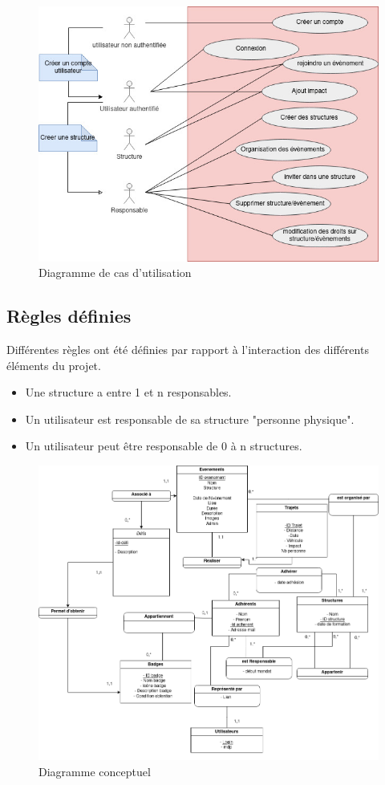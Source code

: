 \begin{figure}[h]
    \centering
    \includegraphics[width=0.8\linewidth]{pictures/use_case_pfa.jpg}
    \caption{Diagramme de cas d'utilisation}
    \label{fig:diag_use_case}
\end{figure}




\subsection{Règles définies}
Différentes règles ont été définies par rapport à l'interaction des différents éléments du projet.
\begin{itemize}
    \item Une structure a entre 1 et n responsables.
    \item Un utilisateur est responsable de sa structure "personne physique".
    \item Un utilisateur peut être responsable de 0 à n structures.
\end{itemize}

\begin{figure}
    \centering
    \includegraphics[width=1.1\linewidth]{pictures/Copie de Copie de CDC_PFA.drawio.png}
    \caption{Diagramme conceptuel}
    \label{fig:diag_concept}
\end{figure}


